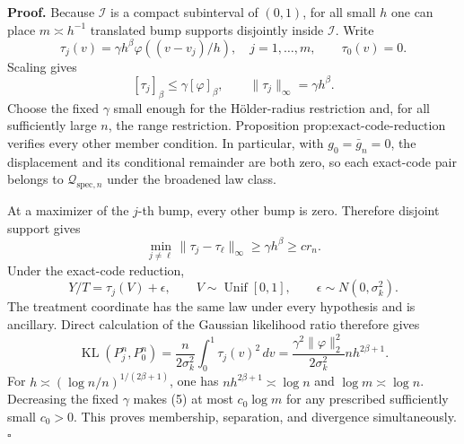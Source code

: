\textbf{Proof.}
Because \(\mathcal I\) is a compact subinterval of \((0,1)\), for all small \(h\) one can place \(m\asymp h^{-1}\) translated bump supports disjointly inside \(\mathcal I\).  Write
\[
 \tau_j(v)=\gamma h^\beta\varphi((v-v_j)/h),
 \quad j=1,\ldots,m,
 \qquad \tau_0(v)=0. \tag{1}
\]
Scaling gives
\[
 [\tau_j]_\beta\le\gamma[\varphi]_\beta,
 \qquad \|\tau_j\|_\infty=\gamma h^\beta. \tag{2}
\]
Choose the fixed \(\gamma\) small enough for the H\"older-radius restriction and, for all sufficiently large \(n\), the range restriction.  Proposition \(\text{prop:exact-code-reduction}\) verifies every other member condition.  In particular, with \(g_0=\bar g_n=0\), the displacement and its conditional remainder are both zero, so each exact-code pair belongs to \(\mathcal Q_{\mathrm{spec},n}\) under the broadened law class.

At a maximizer of the \(j\)-th bump, every other bump is zero.  Therefore disjoint support gives
\[
 \min_{j\ne\ell}\|\tau_j-\tau_\ell\|_\infty
 \ge\gamma h^\beta\ge c r_n. \tag{3}
\]
Under the exact-code reduction,
\[
 Y/T=\tau_j(V)+\epsilon,
 \qquad V\sim\operatorname{Unif}[0,1],
 \qquad \epsilon\sim N(0,\sigma_k^2). \tag{4}
\]
The treatment coordinate has the same law under every hypothesis and is ancillary.  Direct calculation of the Gaussian likelihood ratio therefore gives
\[
 \operatorname{KL}(P_j^n,P_0^n)
 =\frac{n}{2\sigma_k^2}\int_0^1\tau_j(v)^2\,dv
 =\frac{\gamma^2\|\varphi\|_2^2}{2\sigma_k^2}nh^{2\beta+1}. \tag{5}
\]
For \(h\asymp(\log n/n)^{1/(2\beta+1)}\), one has
\(nh^{2\beta+1}\asymp\log n\) and \(\log m\asymp\log n\).  Decreasing the fixed \(\gamma\) makes (5) at most \(c_0\log m\) for any prescribed sufficiently small \(c_0>0\).  This proves membership, separation, and divergence simultaneously. \(\square\)